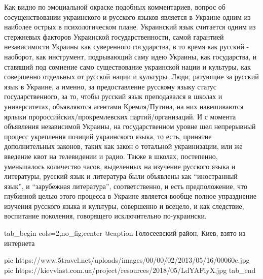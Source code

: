 Как видно по эмоциальной окраске подобных комментариев, вопрос об
сосущенствовании украинского и русского языков является в Украине одним из
наиболее острых в психологическом плане. Украинский язык считается одним из
стержневых факторов Украинской государственности, самой гарантией независимости
Украины как суверенного государства, в то время как русский - наоборот, как
инструмент, подрывающий саму идею Украины, как государства, и ставящий под
сомнение само существование украинской нации и культуры, как совершенно
отдельных от русской нации и культуры. Люди, ратующие за русский язык в
Украине, а именно, за предоставление русскому языку статус государственного, за
то, чтобы русский язык преподавался в школах и университетах, объявляются
агентами Кремля/Путина, на них навешиваются ярлыки пророссийских/прокремлевских
партий/организаций. И с момента объявления независимой Украины, на
государственном уровне шел непрерывный процесс укрепления позиций украинского
языка, то есть, принятие дополнительных законов, таких как закон о тотальной
украинизации, или же введение квот на телевидении и радио. Также в школах,
постепенно, уменьшалось количество часов, выделенных на изучение русского языка
и литературы, русский язык и литература были объявлены как \enquote{иностранный
язык}, и \enquote{зарубежная литература}, соответственно, и есть предположение, что глубинной
целью этого процесса в Украине является вообще полное упразднение изучения
русского языка и культуры, совершенно и всецело, и как следствие, воспитание
поколения, говорящего исключительно по-украински.

\ifcmt
  tab_begin cols=2,no_fig,center
     @caption Голосеевский район, Киев, взято из интернета

     pic https://www.5travel.net/uploads/images/00/00/02/2013/05/16/00060c.jpg
     pic https://kievvlast.com.ua/project/resources/2018/05/LdYAFiyX.jpg
  tab_end
\fi

